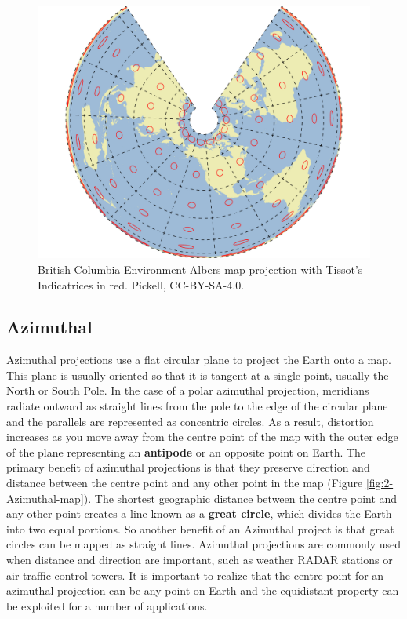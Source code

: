 \documentclass[
]{book}
\begin{document}
\begin{figure}
\includegraphics[width=0.75\linewidth]{images/02-BC-Albers-map} \caption{British Columbia Environment Albers map projection with Tissot's Indicatrices in red. Pickell, CC-BY-SA-4.0.}\label{fig:2-BC-Albers-map}
\end{figure}

\hypertarget{azimuthal}{%
\subsection{Azimuthal}\label{azimuthal}}

Azimuthal projections use a flat circular plane to project the Earth onto a map. This plane is usually oriented so that it is tangent at a single point, usually the North or South Pole. In the case of a polar azimuthal projection, meridians radiate outward as straight lines from the pole to the edge of the circular plane and the parallels are represented as concentric circles. As a result, distortion increases as you move away from the centre point of the map with the outer edge of the plane representing an \textbf{antipode} or an opposite point on Earth. The primary benefit of azimuthal projections is that they preserve direction and distance between the centre point and any other point in the map (Figure \ref{fig:2-Azimuthal-map}). The shortest geographic distance between the centre point and any other point creates a line known as a \textbf{great circle}, which divides the Earth into two equal portions. So another benefit of an Azimuthal project is that great circles can be mapped as straight lines. Azimuthal projections are commonly used when distance and direction are important, such as weather RADAR stations or air traffic control towers. It is important to realize that the centre point for an azimuthal projection can be any point on Earth and the equidistant property can be exploited for a number of applications.
\end{document}
